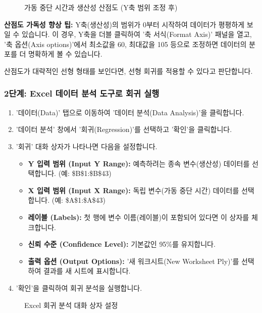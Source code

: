 \documentclass[11pt,a4paper]{book}
\theoremstyle{definition}
\begin{document}
\begin{figure}[h!]
    \centering
    \caption{가동 중단 시간과 생산성 산점도 (Y축 범위 조정 후)}
    \label{fig:downtime_scatter_formatted}
\end{figure}
\begin{infobox}
\textbf{산점도 가독성 향상 팁:}
Y축(생산성)의 범위가 0부터 시작하여 데이터가 평평하게 보일 수 있습니다. 이 경우, Y축을 더블 클릭하여 '축 서식(Format Axis)' 패널을 열고, '축 옵션(Axis options)'에서 최소값을 60, 최대값을 105 등으로 조정하면 데이터의 분포를 더 명확하게 볼 수 있습니다.
\end{infobox}
산점도가 대략적인 선형 형태를 보인다면, 선형 회귀를 적용할 수 있다고 판단합니다.

\subsubsection{2단계: Excel 데이터 분석 도구로 회귀 실행}
\begin{enumerate}
    \item '데이터(Data)' 탭으로 이동하여 '데이터 분석(Data Analysis)'을 클릭합니다.
    \item '데이터 분석' 창에서 '회귀(Regression)'를 선택하고 '확인'을 클릭합니다.
    \item '회귀' 대화 상자가 나타나면 다음을 설정합니다.
    \begin{itemize}
        \item \textbf{Y 입력 범위 (Input Y Range):} 예측하려는 종속 변수(생산성) 데이터를 선택합니다. (예: \$B\$1:\$B\$43)
        \item \textbf{X 입력 범위 (Input X Range):} 독립 변수(가동 중단 시간) 데이터를 선택합니다. (예: \$A\$1:\$A\$43)
        \item \textbf{레이블 (Labels):} 첫 행에 변수 이름(레이블)이 포함되어 있다면 이 상자를 체크합니다.
        \item \textbf{신뢰 수준 (Confidence Level):} 기본값인 95\%를 유지합니다.
        \item \textbf{출력 옵션 (Output Options):} '새 워크시트(New Worksheet Ply)'를 선택하여 결과를 새 시트에 표시합니다.
    \end{itemize}
    \item '확인'을 클릭하여 회귀 분석을 실행합니다.
\end{enumerate}

\begin{figure}[h!]
    \centering
    \caption{Excel 회귀 분석 대화 상자 설정}
    \label{fig:excel_regression_dialog}
\end{figure}
\end{document}
